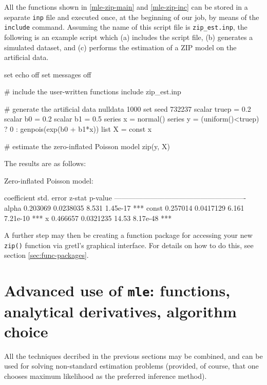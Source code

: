 All the functions shown in \ref{mle-zip-main} and \ref{mle-zip-inc} can
be stored in a separate \texttt{inp} file and executed once, at the
beginning of our job, by means of the \texttt{include}
command.  Assuming the name of this script file is
\texttt{zip\_est.inp}, the following is an example script which
(a) includes the script file, (b) generates a simulated dataset,
and (c) performs the estimation of a ZIP model on the artificial data.

\begin{code}
set echo off
set messages off

# include the user-written functions
include zip_est.inp

# generate the artificial data
nulldata 1000
set seed 732237
scalar truep = 0.2
scalar b0 = 0.2
scalar b1 = 0.5
series x = normal()
series y = (uniform()<truep) ? 0 : genpois(exp(b0 + b1*x))
list X = const x

# estimate the zero-inflated Poisson model
zip(y, X)
\end{code}

The results are as follows:

\begin{code}
Zero-inflated Poisson model:

             coefficient   std. error   z-stat   p-value 
  -------------------------------------------------------
  alpha       0.203069     0.0238035     8.531   1.45e-17 ***
  const       0.257014     0.0417129     6.161   7.21e-10 ***
  x           0.466657     0.0321235    14.53    8.17e-48 ***
\end{code}

A further step may then be creating a function package for accessing
your new \texttt{zip()} function via gretl's graphical interface. For
details on how to do this, see section \ref{sec:func-packages}.

\section{Advanced use of \texttt{mle}: functions, analytical
  derivatives, algorithm choice}
\label{sec:mle-adv}

All the techniques decribed in the previous sections may be combined,
and  can be used for solving non-standard estimation problems
(provided, of course, that one chooses maximum likelihood as the
preferred inference method).


